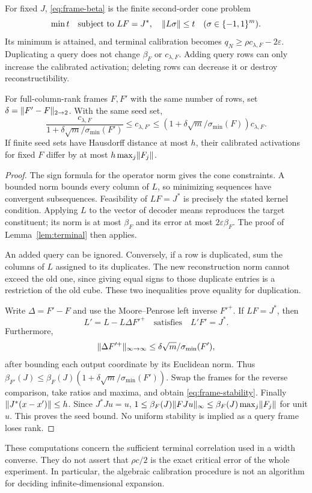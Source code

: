 \begin{theorem}\label{thm:frame}
For fixed $J$, \eqref{eq:frame-beta} is the finite second-order cone problem
\[
 \min t\quad\text{subject to }LF=J^*,\quad
                  \lVert L\sigma\rVert\le t\quad(\sigma\in\{-1,1\}^m).
\]
Its minimum is attained, and terminal calibration becomes
$q_N\ge\rho c_{\lambda,F}-2\varepsilon$.
Duplicating a query does not change $\beta_F$ or $c_{\lambda,F}$. Adding query rows can only increase the calibrated activation; deleting rows can decrease it or destroy reconstructibility.

For full-column-rank frames $F,F'$ with the same number of rows, set
$\delta=\lVert F'-F\rVert_{2\to2}$. With the same seed set,
\begin{equation}\label{eq:frame-stability}
 \frac{c_{\lambda,F}}{1+\delta\sqrt m/\sigma_{\min}(F')}
 \le c_{\lambda,F'}
 \le (1+\delta\sqrt m/\sigma_{\min}(F))c_{\lambda,F}.
\end{equation}
If finite seed sets have Hausdorff distance at most $h$, their calibrated activations for fixed $F$ differ by at most $h\max_j\lVert F_j\rVert$.
\end{theorem}
\begin{proof}
The sign formula for the operator norm gives the cone constraints. A bounded norm bounds every column of $L$, so minimizing sequences have convergent subsequences. Feasibility of $LF=J^*$ is precisely the stated kernel condition. Applying $L$ to the vector of decoder means reproduces the target constituent; its norm is at most $\beta_F$ and its error at most $2\varepsilon\beta_F$. The proof of Lemma~\ref{lem:terminal} then applies.

An added query can be ignored. Conversely, if a row is duplicated, sum the columns of $L$ assigned to its duplicates. The new reconstruction norm cannot exceed the old one, since giving equal signs to those duplicate entries is a restriction of the old cube. These two inequalities prove equality for duplication.

Write $\Delta=F'-F$ and use the Moore--Penrose left inverse $F'^+$. If $LF=J^*$, then
\[
 L'=L-L\Delta F'^+\quad\text{satisfies}\quad L'F'=J^*.
\]
Furthermore,
\[
 \lVert\Delta F'^+\rVert_{\infty\to\infty}
 \le\delta\sqrt m/\sigma_{\min}(F'),
\]
after bounding each output coordinate by its Euclidean norm. Thus
$\beta_{F'}(J)\le\beta_F(J)(1+\delta\sqrt m/\sigma_{\min}(F'))$.
Swap the frames for the reverse comparison, take ratios and maxima, and obtain \eqref{eq:frame-stability}. Finally $\lVert J^*(x-x')\rVert\le h$. Since $J^*Ju=u$,
$1\le\beta_F(J)\lVert FJu\rVert_\infty\le\beta_F(J)\max_j\lVert F_j\rVert$
for unit $u$. This proves the seed bound. No uniform stability is implied as a query frame loses rank.
\end{proof}

These computations concern the sufficient terminal correlation used in a width converse. They do not assert that $\rho c/2$ is the exact critical error of the whole experiment. In particular, the algebraic calibration procedure is not an algorithm for deciding infinite-dimensional expansion.
